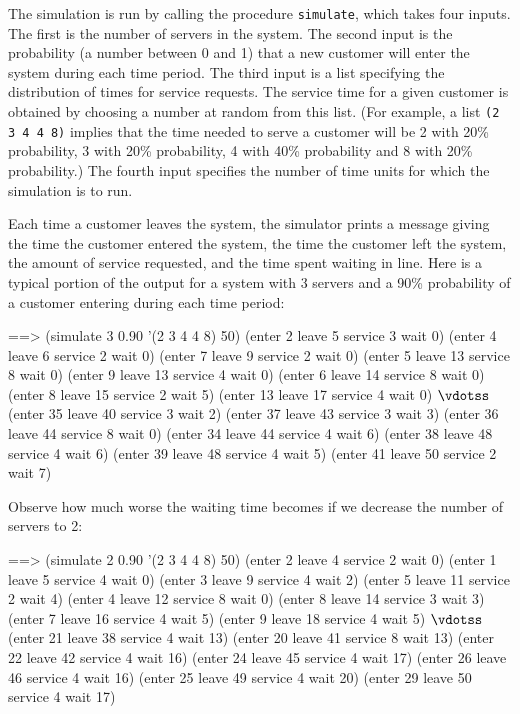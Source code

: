 
The simulation is run by calling the procedure {\tt simulate}, which
takes four inputs.  The first is the number of servers in the system.
The second input is the probability (a number between 0 and 1) that a
new customer will enter the system during each time period.  The third
input is a list specifying the distribution of times for service
requests.  The service time for a given customer is obtained by
choosing a number at random from this list.  (For example, a list {\tt (2
3 4 4 8)} implies that the time needed to serve a customer will be 2
with 20\% probability, 3 with 20\% probability, 4 with 40\% probability
and 8 with 20\% probability.)  The fourth input specifies the number of
time units for which the simulation is to run.

Each time a customer leaves the system, the simulator prints a message
giving the time the customer entered the system,
the time the customer left the system,
the amount of service requested, and the time spent waiting in
line.  Here is a typical portion of the output for a system with 3
servers and a 90\% probability of a customer entering during each time
period:

\code
==> (simulate 3 0.90 '(2 3 4 4 8) 50)
(enter 2 leave 5 service 3 wait 0) 
(enter 4 leave 6 service 2 wait 0) 
(enter 7 leave 9 service 2 wait 0) 
(enter 5 leave 13 service 8 wait 0) 
(enter 9 leave 13 service 4 wait 0) 
(enter 6 leave 14 service 8 wait 0) 
(enter 8 leave 15 service 2 wait 5) 
(enter 13 leave 17 service 4 wait 0) 
$\vdotss$
(enter 35 leave 40 service 3 wait 2) 
(enter 37 leave 43 service 3 wait 3) 
(enter 36 leave 44 service 8 wait 0) 
(enter 34 leave 44 service 4 wait 6) 
(enter 38 leave 48 service 4 wait 6) 
(enter 39 leave 48 service 4 wait 5) 
(enter 41 leave 50 service 2 wait 7) 
\uncode

Observe how much worse the waiting time becomes if we
decrease the number of servers to 2:

\code
==> (simulate 2 0.90 '(2 3 4 4 8) 50)
(enter 2 leave 4 service 2 wait 0) 
(enter 1 leave 5 service 4 wait 0) 
(enter 3 leave 9 service 4 wait 2) 
(enter 5 leave 11 service 2 wait 4) 
(enter 4 leave 12 service 8 wait 0) 
(enter 8 leave 14 service 3 wait 3) 
(enter 7 leave 16 service 4 wait 5) 
(enter 9 leave 18 service 4 wait 5) 
$\vdotss$
(enter 21 leave 38 service 4 wait 13) 
(enter 20 leave 41 service 8 wait 13) 
(enter 22 leave 42 service 4 wait 16) 
(enter 24 leave 45 service 4 wait 17) 
(enter 26 leave 46 service 4 wait 16) 
(enter 25 leave 49 service 4 wait 20) 
(enter 29 leave 50 service 4 wait 17) 
\uncode

